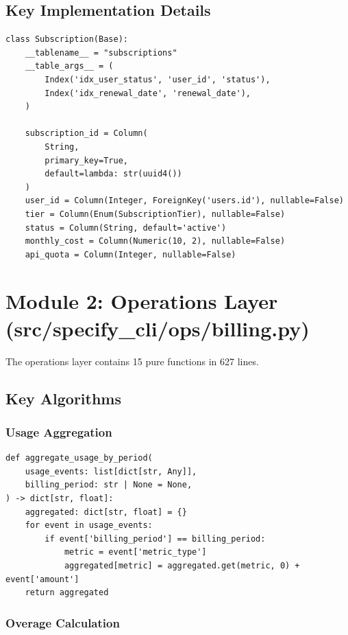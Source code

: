\documentclass[12pt]{report}
\begin{document}
\subsection{Key Implementation Details}

\begin{lstlisting}
class Subscription(Base):
    __tablename__ = "subscriptions"
    __table_args__ = (
        Index('idx_user_status', 'user_id', 'status'),
        Index('idx_renewal_date', 'renewal_date'),
    )

    subscription_id = Column(
        String,
        primary_key=True,
        default=lambda: str(uuid4())
    )
    user_id = Column(Integer, ForeignKey('users.id'), nullable=False)
    tier = Column(Enum(SubscriptionTier), nullable=False)
    status = Column(String, default='active')
    monthly_cost = Column(Numeric(10, 2), nullable=False)
    api_quota = Column(Integer, nullable=False)
\end{lstlisting}

\section{Module 2: Operations Layer (src/specify\_cli/ops/billing.py)}

The operations layer contains 15 pure functions in 627 lines.

\subsection{Key Algorithms}

\subsubsection{Usage Aggregation}

\begin{lstlisting}
def aggregate_usage_by_period(
    usage_events: list[dict[str, Any]],
    billing_period: str | None = None,
) -> dict[str, float]:
    aggregated: dict[str, float] = {}
    for event in usage_events:
        if event['billing_period'] == billing_period:
            metric = event['metric_type']
            aggregated[metric] = aggregated.get(metric, 0) + event['amount']
    return aggregated
\end{lstlisting}

\subsubsection{Overage Calculation}
\end{document}
